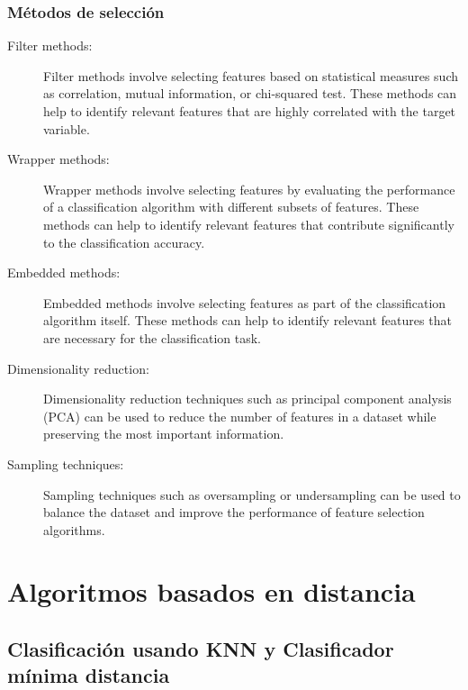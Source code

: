 \documentclass[12pt,a4paper, brazil]{article}
\begin{document}
        \subsubsection{Métodos de selección}
        
            \begin{description}
          \item[Filter methods:] Filter methods involve selecting features based on statistical measures such as correlation, mutual information, or chi-squared test. These methods can help to identify relevant features that are highly correlated with the target variable.
        
          \item[Wrapper methods:] Wrapper methods involve selecting features by evaluating the performance of a classification algorithm with different subsets of features. These methods can help to identify relevant features that contribute significantly to the classification accuracy.
        
          \item[Embedded methods:] Embedded methods involve selecting features as part of the classification algorithm itself. These methods can help to identify relevant features that are necessary for the classification task.
        
          \item[Dimensionality reduction:] Dimensionality reduction techniques such as principal component analysis (PCA) can be used to reduce the number of features in a dataset while preserving the most important information.
        
          \item[Sampling techniques:] Sampling techniques such as oversampling or undersampling can be used to balance the dataset and improve the performance of feature selection algorithms.
        \end{description}


\section{Algoritmos basados en distancia}
    \subsection{Clasificación usando KNN y Clasificador mínima distancia}
    
\end{document}
